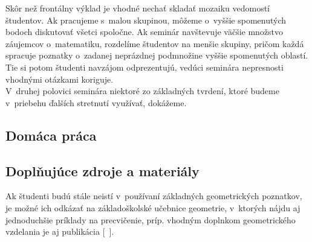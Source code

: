 \kom Skôr než frontálny výklad je vhodné nechať skladať mozaiku vedomostí študentov. Ak pracujeme s~malou skupinou, môžeme o~vyššie spomenutých bodoch diskutovať všetci spoločne. Ak seminár navštevuje väčšie množstvo záujemcov o~matematiku, rozdelíme študentov na menšie skupiny, pričom každá spracuje poznatky o~zadanej neprázdnej podmnožine vyššie spomenutých oblastí. Tie si potom študenti navzájom odprezentujú, vedúci seminára nepresnosti vhodnými otázkami koriguje.
\\
\kom V~druhej polovici seminára niektoré zo základných tvrdení, ktoré budeme v~priebehu ďalších stretnutí využívať, dokážeme.\\

% 

% 

% 

% 

% 

% 

% 



\subsection*{Domáca práca}





% 


\subsection*{Doplňujúce zdroje a materiály}
Ak študenti budú stále neistí v~používaní základných geometrických poznatkov, je možné ich odkázať na základoškolské učebnice geometrie, v~ktorých nájdu aj jednoduchšie príklady na precvičenie, príp. vhodným doplnkom geometrického vzdelania je aj publikácia [~\cite{kadlecek1996}].
